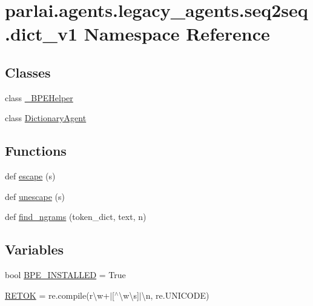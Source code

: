 \hypertarget{namespaceparlai_1_1agents_1_1legacy__agents_1_1seq2seq_1_1dict__v1}{}\section{parlai.\+agents.\+legacy\+\_\+agents.\+seq2seq.\+dict\+\_\+v1 Namespace Reference}
\label{namespaceparlai_1_1agents_1_1legacy__agents_1_1seq2seq_1_1dict__v1}
\subsection*{Classes}
\begin{DoxyCompactItemize}
\item 
class \hyperlink{classparlai_1_1agents_1_1legacy__agents_1_1seq2seq_1_1dict__v1_1_1__BPEHelper}{\+\_\+\+B\+P\+E\+Helper}
\item 
class \hyperlink{classparlai_1_1agents_1_1legacy__agents_1_1seq2seq_1_1dict__v1_1_1DictionaryAgent}{Dictionary\+Agent}
\end{DoxyCompactItemize}
\subsection*{Functions}
\begin{DoxyCompactItemize}
\item 
def \hyperlink{namespaceparlai_1_1agents_1_1legacy__agents_1_1seq2seq_1_1dict__v1_a780f6055b01f2cffa03c670159317ee0}{escape} (s)
\item 
def \hyperlink{namespaceparlai_1_1agents_1_1legacy__agents_1_1seq2seq_1_1dict__v1_affad139ddec76996dc9a93f6123d545e}{unescape} (s)
\item 
def \hyperlink{namespaceparlai_1_1agents_1_1legacy__agents_1_1seq2seq_1_1dict__v1_ac37e7654855b4cdf9b8a6cb1a2193a17}{find\+\_\+ngrams} (token\+\_\+dict, text, n)
\end{DoxyCompactItemize}
\subsection*{Variables}
\begin{DoxyCompactItemize}
\item 
bool \hyperlink{namespaceparlai_1_1agents_1_1legacy__agents_1_1seq2seq_1_1dict__v1_a62905088b0069e57b6c6de4f778535ba}{B\+P\+E\+\_\+\+I\+N\+S\+T\+A\+L\+L\+ED} = True
\item 
\hyperlink{namespaceparlai_1_1agents_1_1legacy__agents_1_1seq2seq_1_1dict__v1_ad5b8a872f88a18dabce2f713af40ac66}{R\+E\+T\+OK} = re.\+compile(r\textquotesingle{}\textbackslash{}w+$\vert$\mbox{[}$^\wedge$\textbackslash{}w\textbackslash{}s\mbox{]}$\vert$\textbackslash{}n\textquotesingle{}, re.\+U\+N\+I\+C\+O\+DE)
\end{DoxyCompactItemize}


